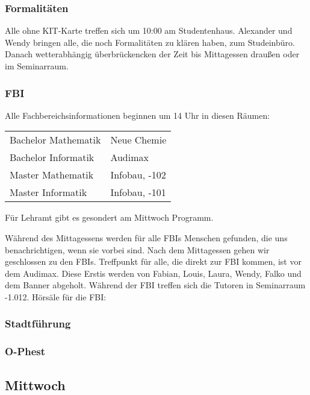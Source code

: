 \documentclass[10pt,twocolumn,ngerman]{scrartcl}
\begin{document}
\subsubsection{Formalitäten}

Alle ohne KIT-Karte treffen sich um 10:00 am Studentenhaus. Alexander
und Wendy bringen alle, die noch Formalitäten zu klären haben, zum
Studeinbüro. Danach wetterabhängig überbrückencken der Zeit bis Mittagessen
draußen oder im Seminarraum.

\subsubsection{FBI}

Alle Fachbereichsinformationen beginnen um 14 Uhr in diesen Räumen:
\begin{tabular}{ll}
    Bachelor Mathematik & Neue Chemie   \\
    Bachelor Informatik & Audimax       \\
    Master Mathematik   & Infobau, -102 \\
    Master Informatik   & Infobau, -101 \\
\end{tabular}

Für Lehramt gibt es gesondert am Mittwoch Programm.

Während des Mittagessens werden für alle FBIs Menschen gefunden, die
uns benachrichtigen, wenn sie vorbei sind. Nach dem Mittagessen gehen
wir geschlossen zu den FBIs. Treffpunkt für alle, die direkt zur FBI
kommen, ist vor dem Audimax. Diese Erstis werden von Fabian, Louis,
Laura, Wendy, Falko und dem Banner abgeholt. Während der FBI treffen
sich die Tutoren in Seminarraum -1.012. Hörsäle für die FBI:\medskip{}

\subsubsection{Stadtführung}


\subsubsection{O-Phest}




\subsection{Mittwoch}
\end{document}
